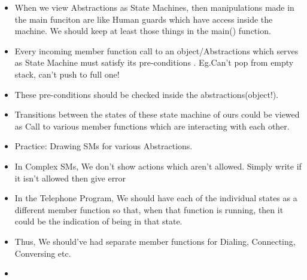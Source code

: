 \documentclass{article}
\begin{document}
\begin{itemize}
  \item When we view Abstractions as State Machines, then manipulations made in the main funciton are like Human guards which have access inside the machine. We should keep at least those things in the main() function.
  \item  Every incoming member function call to an object/Abstractions which serves as State Machine must satisfy its pre-conditions . Eg.Can't pop from empty stack, can't push to full one!
  \item These pre-conditions should be checked inside the abstractions(object!).
  \item Transitions between the states of these state machine of ours could be viewed as Call to various member functions which are interacting with each other.
  \item Practice: Drawing SMs for various Abstractions.
  \item In Complex SMs, We don't show actions which aren't allowed. Simply write if it isn't allowed then give error
  \item In the Telephone Program, We should have each of the individual states as a different member function so that, when that function is running, then it could be the indication of being in that state.
  \item Thus, We should've had separate member functions for Dialing, Connecting, Conversing etc.
  \item
\end{itemize}
\end{document}
